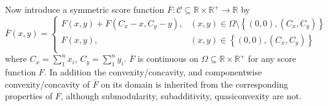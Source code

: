 \documentclass{article}
\theoremstyle{case}
\begin{document}
Now introduce a symmetric score function $\overline{F}\colon \mathcal{C} \subseteq \mathbb{R} \times \mathbb{R}^{+} \to \mathbb{R}$ by
\[   
\overline{F}\left( x,y\right) = \left\{
\begin{array}{ll}
      F\left( x,y\right) + F\left( C_x-x, C_y-y\right), & \left( x,y\right) \in \Omega \setminus{\left\lbrace \left( 0,0\right), \left( C_x, C_y\right) \right\rbrace}  \\
      F\left( x,y\right), & \left( x,y\right) \in \left\lbrace \left( 0,0\right), \left( C_x, C_y\right) \right\rbrace  \\
\end{array} 
\right. 
\]
where $C_x = \sum_1^n x_i$, $C_y = \sum_1^n y_i$. $\overline{F}$ is continuous on $\Omega \subseteq \mathbb{R} \times \mathbb{R}^{+}$ for any score function $F$. In addition the convexity/concavity, and componentwise convexity/concavity of $\overline{F}$ on its domain is inherited from the corresponding properties of $F$, although submodularity, subadditivity, quasiconvexity are not.
\end{document}
